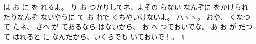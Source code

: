 は
お
に
を
れるよ。
り
お
つかりしてネ、よその
らない
なんぞに
をかけられたりなんぞ
ないやうに
て
お
れで
くちやいけないよ。
ハヽヽ。
おや、
くなつて
たネ、
さへ
が
てあるなら
はないから、
お
へ
つておいでな。
あ
お
が
だつて
はれると
に
なんだから、いくらでも
いておいで！。
』

